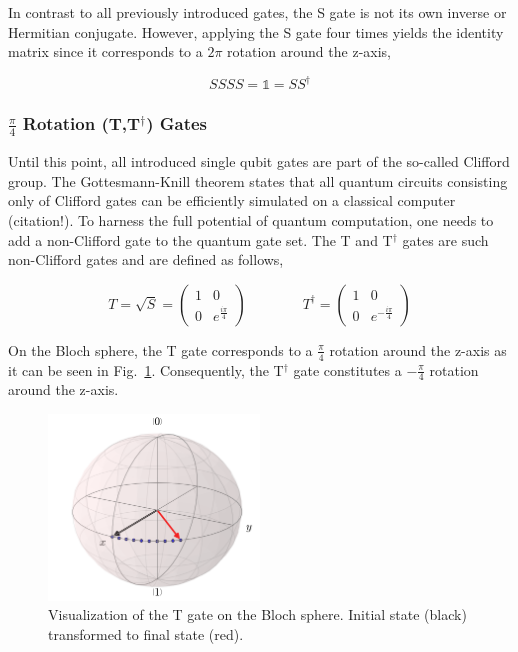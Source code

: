 In contrast to all previously introduced gates, the S gate is not its own inverse or Hermitian conjugate. However, applying the S gate four times yields the identity matrix since it corresponds to a $2\pi$ rotation around the z-axis,

\begin{equation}
SSSS = \mathbb{1} = SS^\dagger
\end{equation}

\subsubsection{$\frac{\pi}{4}$ Rotation (T,T$^\dagger$) Gates}
\label{subsubsubsec:noncliffordgates}

Until this point, all introduced single qubit gates are part of the so-called Clifford group. The Gottesmann-Knill theorem states that all quantum circuits consisting only of Clifford gates can be efficiently simulated on a classical computer (citation!). To harness the full potential of quantum computation, one needs to add a non-Clifford gate to the quantum gate set. The T and T$^\dagger$ gates are such non-Clifford gates and are defined as follows,

\begin{equation}
T = \sqrt{S} = \begin{pmatrix}
 1 & 0 \\ 
 0 & e^{\frac{i\pi}{4}}
 \end{pmatrix}
\quad \quad \quad \quad
T^\dagger = \begin{pmatrix}
 1 & 0 \\ 
 0 & e^{-\frac{i\pi}{4}}
 \end{pmatrix}
\end{equation}

On the Bloch sphere, the T gate corresponds to a $\frac{\pi}{4}$ rotation around the z-axis as it can be seen in Fig.~\ref{img:blochtgate}. Consequently, the T$^\dagger$ gate constitutes a $-\frac{\pi}{4}$ rotation around the z-axis.

\begin{figure}[ht]
   \centering
   \includegraphics[width=0.5\textwidth]{img/blochtgate.png}
   \caption{Visualization of the T gate on the Bloch sphere. Initial state (black) transformed to final state (red).}
   \label{img:blochtgate}
\end{figure}

